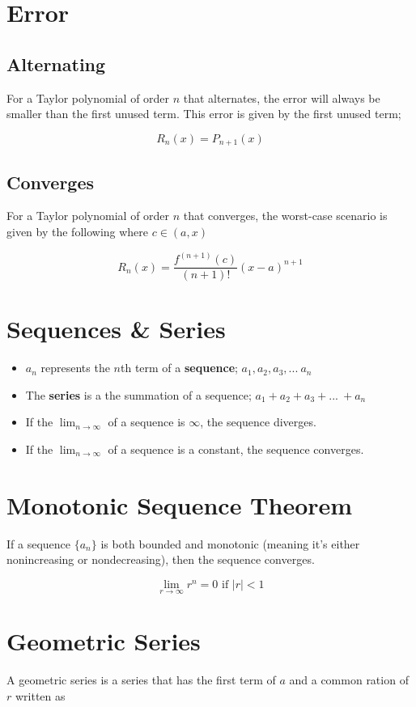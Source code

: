 \documentclass[12pt]{article}
\begin{document}
\section{Error}


\subsection{Alternating}
For a Taylor polynomial of order $n$ that alternates, the error will always be smaller than the first unused term. This error is given by the first unused term;

$$R_n(x) = P_{n+1}(x)$$


\subsection{Converges}

For a Taylor polynomial of order $n$ that converges, the worst-case scenario is given by the following where $c \in (a,x)$

$$R_n(x) = \frac{f^{(n+1)}(c)}{(n+1)!} (x-a)^{n+1}$$


\section{Sequences \& Series}

\begin{itemize}
    \item $a_n$ represents the $n$th term of a \textbf{sequence}; $a_1, a_2, a_3, ...\ a_n$
    \item The \textbf{series} is a the summation of a sequence; $a_1 + a_2 + a_3 + ...\ + a_n$
    \item If the $\lim_{n\to\infty}$ of a sequence is $\infty$, the sequence diverges.
    \item If the $\lim_{n\to\infty}$ of a sequence is a constant, the sequence converges.
\end{itemize}

\section{Monotonic Sequence Theorem}
If a sequence $\{a_n\}$ is both  bounded and monotonic (meaning it's either nonincreasing or nondecreasing), then the sequence converges.

$$\lim_{r\to\infty} r^n = 0 \text{ if } |r| < 1$$

\section{Geometric Series}
A geometric series is a series that has the first term of $a$ and a common ration of $r$ written as
\end{document}
